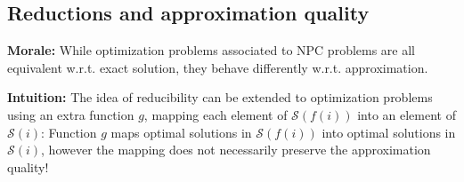 \subsection{Reductions and approximation quality}
\textbf{Morale:} While optimization problems associated to NPC problems are all equivalent w.r.t. exact solution, they behave differently w.r.t. approximation.

\textbf{Intuition:} The idea of reducibility can be extended to optimization problems using an extra function $g$, mapping each element of $\mathcal S(f(i))$ into an element of $\mathcal S(i)$:
Function $g$ maps optimal solutions in $\mathcal S(f(i))$ into optimal solutions in $\mathcal S(i)$, however the mapping does not necessarily preserve the approximation quality!
